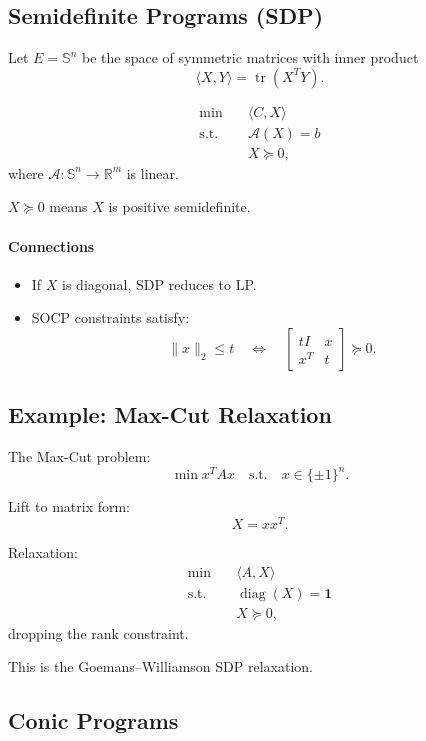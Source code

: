 \documentclass[12pt,oneside]{book}
\numberwithin{equation}{section}
\theoremstyle{definition}
\theoremstyle{plain}
\theoremstyle{remark}
\begin{document}
\subsection{Semidefinite Programs (SDP)}

Let $E = \mathbb{S}^n$ be the space of symmetric matrices with inner product
\[
\langle X, Y \rangle = \operatorname{tr}(X^T Y).
\]

\[
\begin{aligned}
\min \quad & \langle C, X \rangle \\
\text{s.t.} \quad & \mathcal{A}(X) = b \\
& X \succeq 0,
\end{aligned}
\]
where $\mathcal{A} : \mathbb{S}^n \to \mathbb{R}^m$ is linear.

$X \succeq 0$ means $X$ is positive semidefinite.

\paragraph{Connections}
\begin{itemize}
\item If $X$ is diagonal, SDP reduces to LP.
\item SOCP constraints satisfy:
\[
\|x\|_2 \le t \quad \Longleftrightarrow \quad
\begin{bmatrix}
t I & x \\
x^T & t
\end{bmatrix} \succeq 0.
\]
\end{itemize}

\subsection*{Example: Max-Cut Relaxation}

The Max-Cut problem:
\[
\min x^T A x \quad \text{s.t.} \quad x \in \{\pm 1\}^n.
\]

Lift to matrix form:
\[
X = xx^T.
\]

Relaxation:
\[
\begin{aligned}
\min \quad & \langle A, X \rangle \\
\text{s.t.} \quad & \operatorname{diag}(X) = \mathbf{1} \\
& X \succeq 0,
\end{aligned}
\]
dropping the rank constraint.

This is the Goemans--Williamson SDP relaxation.

\subsection{Conic Programs}
\end{document}

